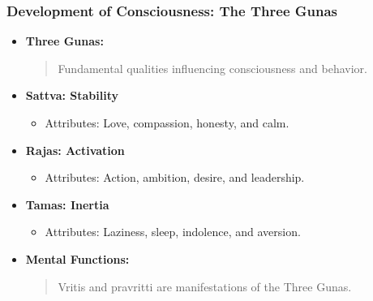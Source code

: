 \begin{frame}[fragile]\frametitle{Development of Consciousness: The Three Gunas}

      \begin{itemize}
        \item \textbf{Three Gunas:}
        \begin{quote}
        Fundamental qualities influencing consciousness and behavior.
        \end{quote}
        \item \textbf{Sattva: Stability}
        \begin{itemize}
            \item Attributes: Love, compassion, honesty, and calm.
        \end{itemize}
        \item \textbf{Rajas: Activation}
        \begin{itemize}
            \item Attributes: Action, ambition, desire, and leadership.
        \end{itemize}
        \item \textbf{Tamas: Inertia}
        \begin{itemize}
            \item Attributes: Laziness, sleep, indolence, and aversion.
        \end{itemize}
        \item \textbf{Mental Functions:}
        \begin{quote}
        Vritis and pravritti are manifestations of the Three Gunas.
        \end{quote}
      \end{itemize}

\end{frame}

